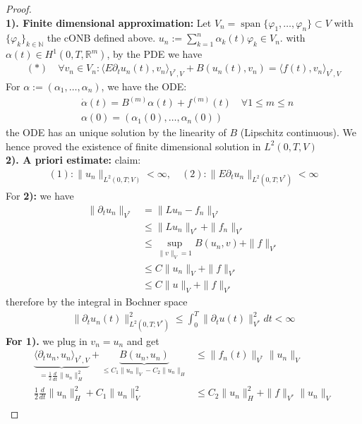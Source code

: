 \documentclass[a4paper,11pt,oneside,fleqn]{book}
\theoremstyle{definition}
\theoremstyle{remark}
\DeclareMathOperator*{\spa}{span}
\begin{document}
 \begin{proof}\quad\\
 \textbf{1). Finite dimensional approximation:}
 Let $V_n = \spa \{\varphi_1, \dots, \varphi_n \} \subset V $ with $\{\varphi_k\}_{k \in \mathbb{N}}$ the cONB defined above. $u_n:= \sum_{k = 1}^n \alpha_k(t) \varphi_k \in V_n.$ with $\alpha(t) \in H^1(0, T, \mathbb{R}^m)$, by the PDE we have
 \begin{align*}(*) \quad
 	\forall v_n \in V_n: \langle E \partial_t u_n(t), v_n \rangle_{V^*, V} + B(u_n(t), v_n) = \langle f(t), v_n \rangle_{V^*, V} 
 \end{align*}
 For $\alpha := (\alpha_1, \dots, \alpha_n)$, we have the ODE:
 \begin{align*}
 	&\dot{\alpha}(t) = B^{(m)} \alpha(t) + f^{(m)}(t) \quad  \forall 1 \le m \le  n \\
 	&\alpha(0) = (\alpha_1(0),  \dots, \alpha_n(0))
 \end{align*}
 the ODE has an unique solution by the linearity of $B$ (Lipschitz continuous). We hence proved the existence of finite dimensional solution in $L^2(0, T, V) $
 \\
 \textbf{2). A priori estimate:}
 claim:
 \begin{align*}
 	(1):\|u_n\|_{L^2(0, T; V)}< \infty,\quad
 	(2):\|E \partial_t u_n\|_{L^2(0, T; V^*)} < \infty
 \end{align*}
 For \textbf{2):} we have
 \begin{align*}
 	\| \partial_t u_n\|_{V^*}  &= \|Lu_n - f_n\|_{V^*}\\
 	&\le \|Lu_n\|_{V^*} + \|f_n\|_{V^*}\\
 	&\le  \sup_{\|v\|_V = 1}B(u_n, v)  + \|f\|_{V^*}\\
 	&\le C \|u_n\|_V + \|f\|_{V^*}\\
 	&\le C \|u\|_V + \|f\|_{V^*}
 \end{align*}
 therefore by the integral in Bochner space
 \begin{align*}
 	\|\partial_t u_n(t)\|_{L^2(0, T; V^*)}^2  \le  \int_0^T \|\partial_t u(t)\|_{V^*}^2 dt < \infty
 \end{align*}
 \textbf{For 1).}
 we plug in $v_n = u_n$ and get 
 \begin{align*}
 	\underbrace{\langle \partial_t u_n, u_n \rangle_{V^*, V}}_{ = \frac{1}{2}\frac{d}{dt}\|u_n\|_H^2} + \underbrace{B(u_n, u_n)}_{\le C_1 \|u_n\|_V - C_2 \|u_n\|_H} &\le \|f_n(t)\|_{V^*}\|u_n\|_V\\
 	\frac{1}{2}\frac{d}{dt}\|u_n\|_H^2 + C_1 \|u_n\|_V^2 &\le C_2 \|u_n\|_H^2 + \|f\|_{V^*}\|u_n\|_V\\

\end{align*}
\end{proof}
\end{document}
